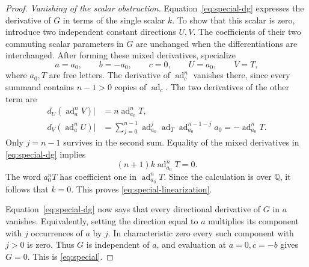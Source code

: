 \documentclass[11pt]{article}
\theoremstyle{definition}
\theoremstyle{remark}
\numberwithin{equation}{section}
\begin{document}
\begin{proof}
\emph{Vanishing of the scalar obstruction.}
Equation~\eqref{eq:special-dg} expresses the derivative of \(G\) in
terms of the single scalar \(k\).  To show that this scalar is zero,
introduce two independent constant directions \(U,V\).  The
coefficients of their two commuting scalar parameters in \(G\)
are unchanged when the differentiations are interchanged.  After
forming these mixed derivatives, specialize
\[
 a=a_0,\qquad b=-a_0,\qquad c=0,\qquad U=a_0,\qquad V=T,
\]
where \(a_0,T\) are free letters.  The derivative of \(\operatorname{ad}_c^n\)
vanishes there, since every summand contains \(n-1>0\) copies of
\(\operatorname{ad}_c\).  The two derivatives of the other term are
\begin{align*}
 d_U(\operatorname{ad}_a^nV)\big|&=n\operatorname{ad}_{a_0}^nT,\\
 d_V(\operatorname{ad}_a^nU)\big|
   &=\sum_{j=0}^{n-1}
       \operatorname{ad}_{a_0}^{j}\operatorname{ad}_T\operatorname{ad}_{a_0}^{n-1-j}a_0
     =-\operatorname{ad}_{a_0}^{n}T.
\end{align*}
Only \(j=n-1\) survives in the second sum.  Equality of the mixed
derivatives in \eqref{eq:special-dg} implies
\[
 (n+1)k\operatorname{ad}_{a_0}^{n}T=0.
\]
The word \(a_0^nT\) has coefficient one in
\(\operatorname{ad}_{a_0}^{n}T\).  Since the calculation is over \(\mathbb Q\), it
follows that \(k=0\).  This proves
\eqref{eq:special-linearization}.

Equation~\eqref{eq:special-dg} now says that every directional
derivative of \(G\) in \(a\) vanishes.  Equivalently, setting the
direction equal to \(a\) multiplies its component with \(j\)
occurrences of \(a\) by \(j\).  In characteristic zero every such
component with \(j>0\) is zero.  Thus \(G\) is independent of
\(a\), and evaluation at \(a=0,c=-b\) gives \(G=0\).  This is
\eqref{eq:special}.
\end{proof}
\end{document}

